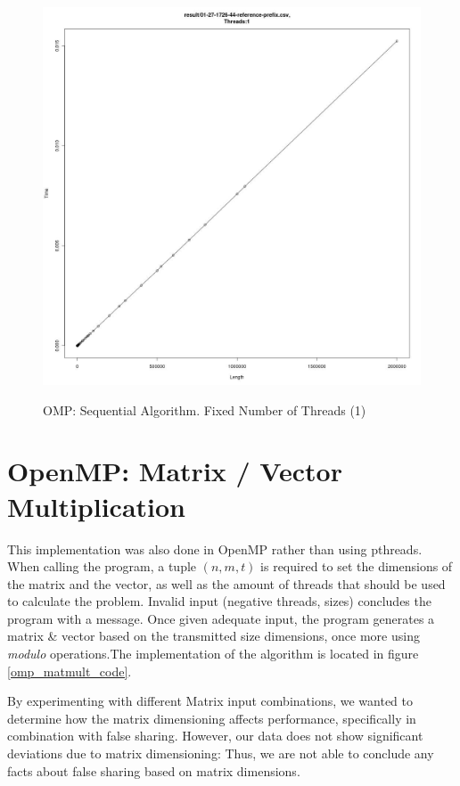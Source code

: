 \documentclass[12pt]{article}
\begin{document}
\begin{figure}[H]
\centering
\caption{OMP: Sequential Algorithm. Fixed Number of Threads (1)}

\includegraphics[scale=0.4]{candidate-graphs/omp_p1_length_time_1_XYZ.jpg}
\label{omp_p1_sequential}
\end{figure}

\newpage
\section{OpenMP: Matrix / Vector Multiplication}
This implementation was also done in OpenMP rather than using pthreads. When calling the program, a tuple $(n, m, t)$ is required to set the dimensions of the matrix and the vector, as well as the amount of threads that should be used to calculate the problem. Invalid input (negative threads, sizes) concludes the program with a message.
Once given adequate input, the program generates a matrix \& vector based on the transmitted size dimensions, once more using \emph{modulo} operations.The implementation of the algorithm is located in figure \ref{omp_matmult_code}.

By experimenting with different Matrix input combinations, we wanted to determine how the matrix dimensioning affects performance, specifically in combination with false sharing. However, our data does not show significant deviations due to matrix dimensioning: Thus, we are not able to conclude any facts about false sharing based on matrix dimensions.
\end{document}
